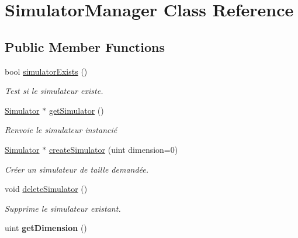 \hypertarget{class_simulator_manager}{}\section{Simulator\+Manager Class Reference}
\label{class_simulator_manager}
\subsection*{Public Member Functions}
\begin{DoxyCompactItemize}
\item 
bool \mbox{\hyperlink{class_simulator_manager_ae76186f657172c36ce5b820432e05350}{simulator\+Exists}} ()
\begin{DoxyCompactList}\small\item\em Test si le simulateur existe. \end{DoxyCompactList}\item 
\mbox{\hyperlink{class_simulator}{Simulator}} $\ast$ \mbox{\hyperlink{class_simulator_manager_aa540cc8716a5fc14dd7f920d554d7828}{get\+Simulator}} ()
\begin{DoxyCompactList}\small\item\em Renvoie le simulateur instancié \end{DoxyCompactList}\item 
\mbox{\hyperlink{class_simulator}{Simulator}} $\ast$ \mbox{\hyperlink{class_simulator_manager_af713a5605970b710c2526e7f6ee51a89}{create\+Simulator}} (uint dimension=0)
\begin{DoxyCompactList}\small\item\em Créer un simulateur de taille demandée. \end{DoxyCompactList}\item 
\mbox{\label{class_simulator_manager_a858397d30594975df99d6f59ab03e57d}} 
void \mbox{\hyperlink{class_simulator_manager_a858397d30594975df99d6f59ab03e57d}{delete\+Simulator}} ()
\begin{DoxyCompactList}\small\item\em Supprime le simulateur existant. \end{DoxyCompactList}\item 
\mbox{\label{class_simulator_manager_a6660c9abb849ae44215625a7f3555857}} 
uint {\bfseries get\+Dimension} ()
\item 
\mbox{\label{class_simulator_manager_a2edfb49c5ec31d9cc893ed1d1d7180a1}} 

\end{DoxyCompactItemize}
